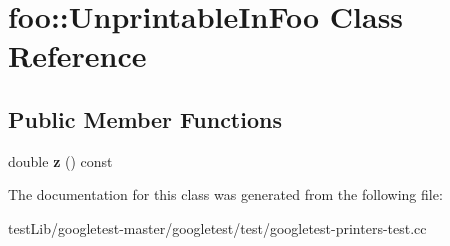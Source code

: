 \hypertarget{classfoo_1_1UnprintableInFoo}{}\section{foo\+:\+:Unprintable\+In\+Foo Class Reference}
\label{classfoo_1_1UnprintableInFoo}
\subsection*{Public Member Functions}
\begin{DoxyCompactItemize}
\item 
\mbox{\label{classfoo_1_1UnprintableInFoo_a3dc8c8e90906bb6f3376474d545e488c}} 
double {\bfseries z} () const
\end{DoxyCompactItemize}


The documentation for this class was generated from the following file\+:\begin{DoxyCompactItemize}
\item 
test\+Lib/googletest-\/master/googletest/test/googletest-\/printers-\/test.\+cc\end{DoxyCompactItemize}
